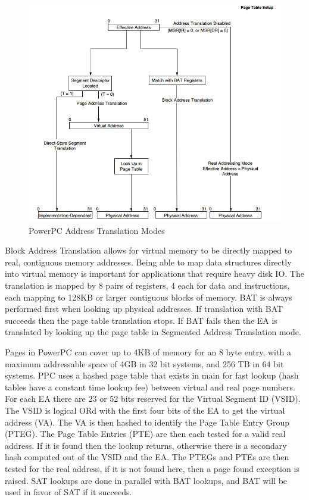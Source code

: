 \documentclass[10pt]{article}
\begin{document}
\par
\begin{figure}[h]
   \centering
   \includegraphics[scale=0.5]{PPC_addressing_flow}
   \caption{PowerPC Address Translation Modes}
\end{figure}
\par

Block Address Translation allows for virtual memory to be directly mapped to real, contiguous memory addresses. Being able to map data structures directly into virtual memory is important for applications that require heavy disk IO. The translation is mapped by 8 pairs of registers, 4 each for data and instructions, each mapping to 128KB or larger contiguous blocks of memory. BAT is always performed first when looking up physical addresses. If translation with BAT succeeds then the page table translation stops.  If BAT fails then the EA is translated by looking up the page table in Segmented Address Translation mode. 
\par
Pages in PowerPC can cover up to 4KB of memory for an 8 byte entry, with a maximum addressable space of 4GB in 32 bit systems, and 256 TB in 64 bit systems. PPC uses a hashed page table that exists in main for fast lookup (hash tables have a constant time lookup fee) between virtual and real page numbers. For each EA there are 23 or 52 bits reserved for the Virtual Segment ID (VSID). The VSID is  logical ORd with the first four bits of the EA to get the virtual address (VA). The VA is then hashed to identify the Page Table Entry Group (PTEG). The Page Table Entries (PTE) are then each tested for a valid real address. If it is found then the lookup returns, otherwise there is a secondary hash computed out of the VSID and the EA. The PTEGs and PTEs are then tested for the real address, if it is not found here, then a page found exception is raised. SAT lookups are done in parallel with BAT lookups, and BAT will be used in favor of SAT if it succeeds. 
\end{document}
